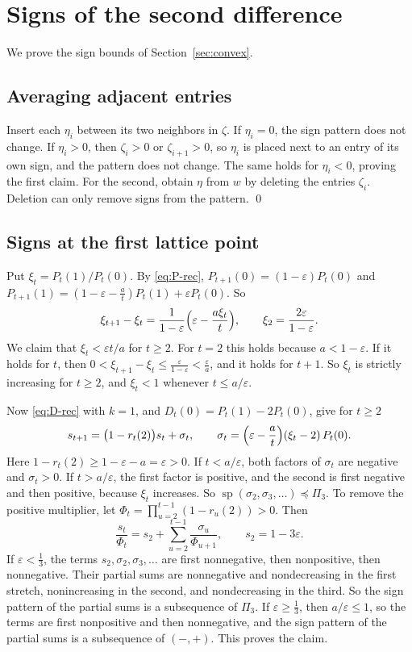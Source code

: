 \section{Signs of the second difference}\label{app:signs}
We prove the sign bounds of Section~\ref{sec:convex}.

\subsection{Averaging adjacent entries}\label{app:signs-step}

Insert each $\eta_i$ between its two neighbors in $\zeta$. If $\eta_i=0$, the
sign pattern does not change. If $\eta_i>0$, then $\zeta_i>0$ or
$\zeta_{i+1}>0$, so $\eta_i$ is placed next to an entry of its own sign, and
the pattern does not change. The same holds for $\eta_i<0$, proving the first claim.
For the second, obtain $\eta$ from $w$ by deleting the entries
$\zeta_i$. Deletion can only remove signs from the pattern. \qed

\subsection{Signs at the first lattice point}\label{app:signs-level}

Put $\xi_t=P_t(1)/P_t(0)$. By \eqref{eq:P-rec}, $P_{t+1}(0)=(1-\varepsilon)P_t(0)$
and $P_{t+1}(1)=(1-\varepsilon-\frac at)P_t(1)+\varepsilon P_t(0)$. So
\[
 \xi_{t+1}-\xi_t=\frac1{1-\varepsilon}\Bigl(\varepsilon-\frac{a\xi_t}t\Bigr),
 \qquad\xi_2=\frac{2\varepsilon}{1-\varepsilon}.
\]
We claim that $\xi_t<\varepsilon t/a$ for $t\ge2$. For $t=2$ this holds
because $a<1-\varepsilon$. If it holds for $t$, then
$0<\xi_{t+1}-\xi_t\le\frac\varepsilon{1-\varepsilon}<\frac\varepsilon a$,
and it holds for $t+1$. So $\xi_t$ is strictly increasing for $t\ge2$, and
$\xi_t<1$ whenever $t\le a/\varepsilon$.

Now \eqref{eq:D-rec} with $k=1$, and $D_t(0)=P_t(1)-2P_t(0)$, give for $t\ge2$
\[
 s_{t+1}=\bigl(1-r_t(2)\bigr)s_t+\sigma_t,\qquad
 \sigma_t=\Bigl(\varepsilon-\frac at\Bigr)(\xi_t-2)\,P_t(0).
\]
Here $1-r_t(2)\ge1-\varepsilon-a=\varepsilon>0$. If $t<a/\varepsilon$, both
factors of $\sigma_t$ are negative and $\sigma_t>0$. If $t>a/\varepsilon$, the
first factor is positive, and the second is first negative and then positive,
because $\xi_t$ increases. So
$\operatorname{sp}(\sigma_2,\sigma_3,\dots)\preceq\Pi_3$. To remove the positive multiplier, let
$\Phi_t=\prod_{u=2}^{t-1}(1-r_u(2))>0$. Then
\[
 \frac{s_t}{\Phi_t}=s_2+\sum_{u=2}^{t-1}\frac{\sigma_u}{\Phi_{u+1}},\qquad
 s_2=1-3\varepsilon .
\]
If $\varepsilon<\frac13$, the terms $s_2,\sigma_2,\sigma_3,\dots$ are first
nonnegative, then nonpositive, then nonnegative. Their partial sums are
nonnegative and nondecreasing in the first stretch, nonincreasing in the
second, and nondecreasing in the third. So the sign pattern of the partial
sums is a subsequence of $\Pi_3$. If $\varepsilon\ge\frac13$, then
$a/\varepsilon\le1$, so the terms are first nonpositive and then nonnegative,
and the sign pattern of the partial sums is a subsequence of $(-,+)$. This
proves the claim.

